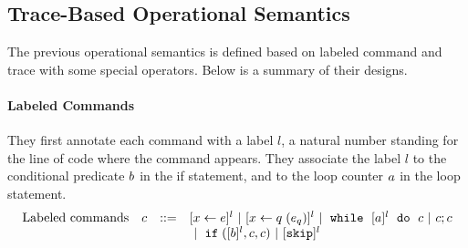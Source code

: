 \subsection*{Trace-Based Operational Semantics}
The previous operational semantics is defined based on labeled command and trace with some special operators.
Below is a summary of their designs.
\paragraph*{Labeled Commands}
They first annotate each command with a label $l$,
a natural number standing for the line of code where the command appears.
They associate the label $l$ to the conditional predicate $b$ in the if statement,
and to the loop counter $a$ in the loop statement.
\[
\begin{array}{llll}
     \mbox{Labeled commands} & c & ::= &   [\mathrel{ x \leftarrow e }]^{l} ~|~  [\mathrel{ x \leftarrow q }(e_q)]^{l}
 ~|~  \;\mathtt{while}\; ~ [a]^{l} ~ \;\mathtt{do}\; ~ c  ~|~ c;c \\
 & & & ~|~ \;\mathtt{if}\;([b]^l, c, c) 	 ~|~ [\mathtt{skip}]^{l} \\
\end{array}
\]
